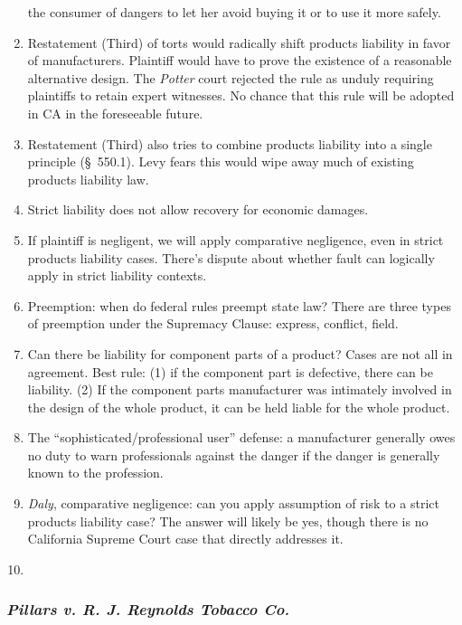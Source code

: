 \begin{enumerate}
    the consumer of dangers to let her avoid buying it or to use it more safely.
    \item Restatement (Third) of torts would radically shift products liability 
    in favor of manufacturers. Plaintiff would have to prove the existence of a 
    reasonable alternative design. The \emph{Potter} court rejected the rule as 
    unduly requiring plaintiffs to retain expert witnesses. No chance that this 
    rule will be adopted in CA in the foreseeable future.
    \item Restatement (Third) also tries to combine products liability into a 
    single principle (\S\ 550.1). Levy fears this would wipe away much of 
    existing products liability law.
    \item Strict liability does not allow recovery for economic damages.
    \item If plaintiff is negligent, we will apply comparative negligence, even 
    in strict products liability cases. There's dispute about whether fault can 
    logically apply in strict liability contexts.
    \item Preemption: when do federal rules preempt state law? There are three 
    types of preemption under the Supremacy Clause: express, conflict, field.
    \item Can there be liability for component parts of a product? Cases are not 
    all in agreement. Best rule: (1) if the component part is defective, there 
    can be liability. (2) If the component parts manufacturer was intimately 
    involved in the design of the whole product, it can be held liable for the 
    whole product.
    \item The ``sophisticated/professional user'' defense: a manufacturer 
    generally owes no duty to warn professionals against the danger if the 
    danger is generally known to the profession.
    \item \emph{Daly}, comparative negligence: can you apply assumption of risk 
    to a strict products liability case? The answer will likely be yes, though 
    there is no California Supreme Court case that directly addresses it.
    \item \end{enumerate}

\subsubsection{\emph{Pillars v. R. J. Reynolds Tobacco Co.}}

